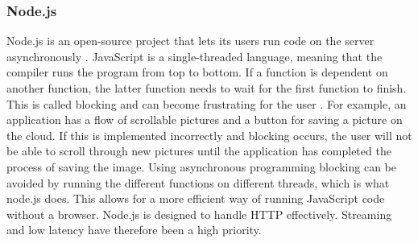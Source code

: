 


\subsubsection{Node.js}%
\label{ssub:Node}
Node.js is an open-source project that lets its users run code on the server asynchronously \cite{node.js}. JavaScript is a single-threaded language, meaning that the compiler runs the program from top to bottom. If a function is dependent on another function, the latter function needs to wait for the first function to finish. This is called blocking and can become frustrating for the user \cite{GeneralAsynchronousProgramming}. For example, an application has a flow of scrollable pictures and a button for saving a picture on the cloud. If this is implemented incorrectly and blocking occurs, the user will not be able to scroll through new pictures until the application has completed the process of saving the image. Using asynchronous programming blocking can be avoided by running the different functions on different threads, which is what node.js does. This allows for a more efficient way of running JavaScript code without a browser. Node.js is designed to handle HTTP effectively. Streaming and low latency have therefore been a high priority. 


